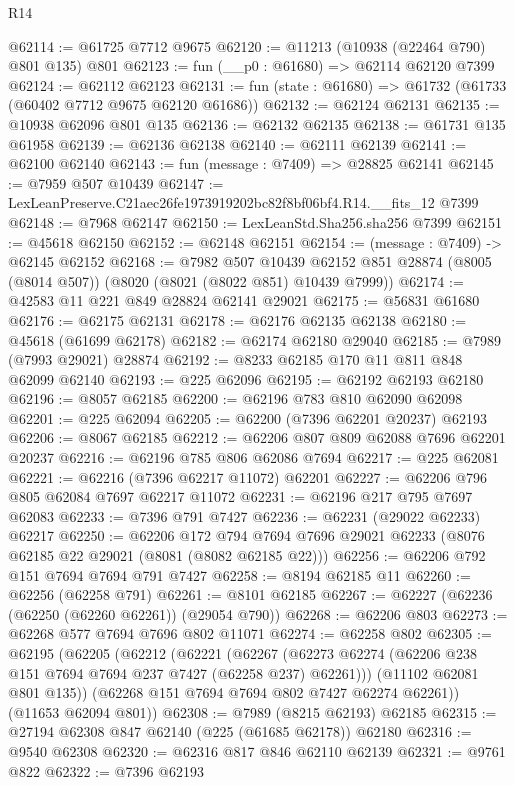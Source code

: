 \begin{lexlean}{R14}
\begin{coremodule}
@62114 := @61725 @7712 @9675
@62120 := @11213 (@10938 (@22464 @790) @801 @135) @801
@62123 := fun (__p0 : @61680) => @62114 @62120 @7399
@62124 := @62112 @62123
@62131 := fun (state : @61680) => @61732 (@61733 (@60402 @7712 @9675 @62120 @61686))
@62132 := @62124 @62131
@62135 := @10938 @62096 @801 @135
@62136 := @62132 @62135
@62138 := @61731 @135 @61958
@62139 := @62136 @62138
@62140 := @62111 @62139
@62141 := @62100 @62140
@62143 := fun (message : @7409) => @28825 @62141
@62145 := @7959 @507 @10439
@62147 := LexLeanPreserve.C21aec26fe1973919202bc82f8bf06bf4.R14.__fits_12 @7399
@62148 := @7968 @62147
@62150 := LexLeanStd.Sha256.sha256 @7399
@62151 := @45618 @62150
@62152 := @62148 @62151
@62154 := (message : @7409) -> @62145 @62152
@62168 := @7982
    @507
    @10439
    @62152
    @851
    @28874
    (@8005 (@8014 @507))
    (@8020 (@8021 (@8022 @851) @10439 @7999))
@62174 := @42583 @11 @221 @849 @28824 @62141 @29021
@62175 := @56831 @61680
@62176 := @62175 @62131
@62178 := @62176 @62135 @62138
@62180 := @45618 (@61699 @62178)
@62182 := @62174 @62180 @29040
@62185 := @7989 (@7993 @29021) @28874
@62192 := @8233 @62185 @170 @11 @811 @848 @62099 @62140
@62193 := @225 @62096
@62195 := @62192 @62193 @62180
@62196 := @8057 @62185
@62200 := @62196 @783 @810 @62090 @62098
@62201 := @225 @62094
@62205 := @62200 (@7396 @62201 @20237) @62193
@62206 := @8067 @62185
@62212 := @62206 @807 @809 @62088 @7696 @62201 @20237
@62216 := @62196 @785 @806 @62086 @7694
@62217 := @225 @62081
@62221 := @62216 (@7396 @62217 @11072) @62201
@62227 := @62206 @796 @805 @62084 @7697 @62217 @11072
@62231 := @62196 @217 @795 @7697 @62083
@62233 := @7396 @791 @7427
@62236 := @62231 (@29022 @62233) @62217
@62250 := @62206
    @172
    @794
    @7694
    @7696
    @29021
    @62233
    (@8076 @62185 @22 @29021 (@8081 (@8082 @62185 @22)))
@62256 := @62206 @792 @151 @7694 @7694 @791 @7427
@62258 := @8194 @62185 @11
@62260 := @62256 (@62258 @791)
@62261 := @8101 @62185
@62267 := @62227 (@62236 (@62250 (@62260 @62261)) (@29054 @790))
@62268 := @62206 @803
@62273 := @62268 @577 @7694 @7696 @802 @11071
@62274 := @62258 @802
@62305 := @62195
    (@62205
      (@62212
        (@62221
          (@62267 (@62273 @62274 (@62206 @238 @151 @7694 @7694 @237 @7427 (@62258 @237) @62261)))
          (@11102 @62081 @801 @135))
        (@62268 @151 @7694 @7694 @802 @7427 @62274 @62261))
      (@11653 @62094 @801))
@62308 := @7989 (@8215 @62193) @62185
@62315 := @27194 @62308 @847 @62140 (@225 (@61685 @62178)) @62180
@62316 := @9540 @62308
@62320 := @62316 @817 @846 @62110 @62139
@62321 := @9761 @822
@62322 := @7396 @62193

\end{coremodule}
\end{lexlean}
